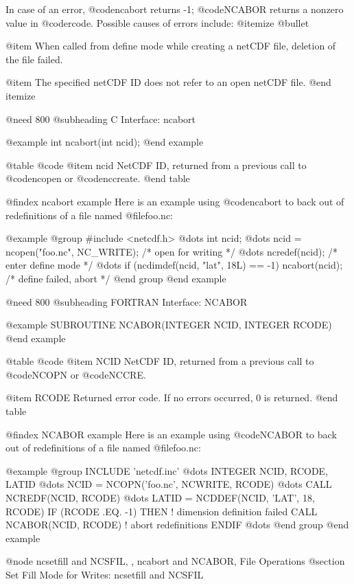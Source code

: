 In case of an error, @code{ncabort} returns -1; @code{NCABOR} returns a
nonzero value in @code{rcode}.  Possible causes of errors include:
@itemize @bullet

@item
When called from define mode while creating a netCDF file, deletion of the
file failed.

@item
The specified netCDF ID does not refer to an open netCDF file.
@end itemize

@need 800
@subheading C Interface:  ncabort

@example
int ncabort(int ncid);
@end example

@table @code
@item ncid
NetCDF ID, returned from a previous call to @code{ncopen} or @code{nccreate}.
@end table

@findex ncabort example
Here is an example using @code{ncabort} to back out of redefinitions of
a file named @file{foo.nc}:

@example
@group
#include <netcdf.h>
   @dots{}
int ncid;
   @dots{}
ncid = ncopen("foo.nc", NC_WRITE);  /* open for writing */
   @dots{}
ncredef(ncid);                    /* enter define mode */
   @dots{}
if (ncdimdef(ncid, "lat", 18L) == -1)
   ncabort(ncid);                 /* define failed, abort */
@end group
@end example

@need 800
@subheading FORTRAN Interface:  NCABOR

@example
      SUBROUTINE NCABOR(INTEGER NCID, INTEGER RCODE)
@end example

@table @code
@item NCID
NetCDF ID, returned from a previous call to @code{NCOPN} or @code{NCCRE}.

@item RCODE
Returned error code.  If no errors occurred, 0 is returned.
@end table

@findex NCABOR example
Here is an example using @code{NCABOR} to back out of redefinitions of
a file named @file{foo.nc}:

@example
@group
      INCLUDE 'netcdf.inc'
         @dots{}
      INTEGER NCID, RCODE, LATID
         @dots{}
      NCID = NCOPN('foo.nc', NCWRITE, RCODE)
         @dots{}
      CALL NCREDF(NCID, RCODE)
         @dots{}
      LATID = NCDDEF(NCID, 'LAT', 18, RCODE)
      IF (RCODE .EQ. -1) THEN  ! dimension definition failed
         CALL NCABOR(NCID, RCODE)  ! abort redefinitions
      ENDIF
         @dots{}
@end group
@end example

@node ncsetfill and NCSFIL,  , ncabort and NCABOR, File Operations
@section Set Fill Mode for Writes:  ncsetfill and NCSFIL


